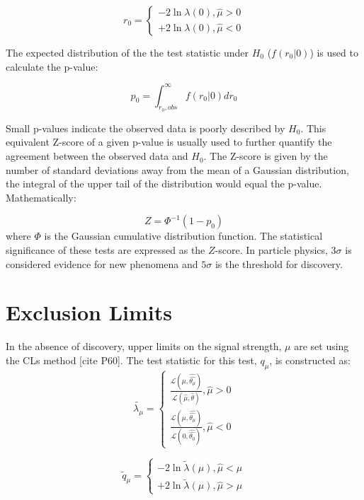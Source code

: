 \begin{equation}
r_{0}=\left\{ \begin{array}{ll}
-2\ln \lambda (0), \hat{\mu} > 0\\
+2\ln \lambda (0), \hat{\mu} < 0
\end{array}
\right.
\end{equation}

The expected distribution of the the test statistic under $H_{0}$ ($f(r_{0}|0)$) is used to calculate the p-value:

\begin{equation}
p_{0}=\int_{r_0,obs}^{\infty} f(r_{0}|0)dr_{0}
\end{equation}

Small p-values indicate the observed data is poorly described by $H_{0}$. This equivalent Z-score of a given p-value is usually used to further quantify the agreement between the observed data and $H_{0}$. The Z-score is given by the number of standard deviations away from the mean of a Gaussian distribution, the integral of the upper tail of the distribution would equal the p-value. Mathematically:

\begin{equation}
Z = \Phi^{-1}(1-p_{0})
\end{equation}
where $\Phi$ is the Gaussian cumulative distribution function. The statistical significance of these tests are expressed as the $Z$-score. In particle physics, $3\sigma$ is considered evidence for new phenomena and $5\sigma$ is the threshold for discovery. 
\section{Exclusion Limits}
In the absence of discovery, upper limits on the signal strength, $\mu$ are set using the CLs method [cite P60]. The test statistic for this test, $q_{\mu}$, is constructed as:
\begin{equation}
\tilde{\lambda_{\mu}}=\left\{ \begin{array}{ll}
\frac{\mathcal{L}(\mu,\hat{\hat{\theta_{\mu}}})}{\mathcal{L}(\hat{\mu},\hat{\theta})},  \hat{\mu} > 0\\
\frac{\mathcal{L}(\mu,\hat{\hat{\theta_{\mu}}})}{\mathcal{L}(0,\hat{\hat{\theta_{0}}})},  \hat{\mu} < 0
\end{array} 
\right.
\end{equation}
 
 \begin{equation}
\tilde{q}_{\mu}=\left\{ \begin{array}{ll}
-2\ln \tilde{\lambda}(\mu),  \hat{\mu} < \mu \\
+2\ln \tilde{\lambda}(\mu),  \hat{\mu} > \mu 
\end{array}
\right.
\end{equation}
 
